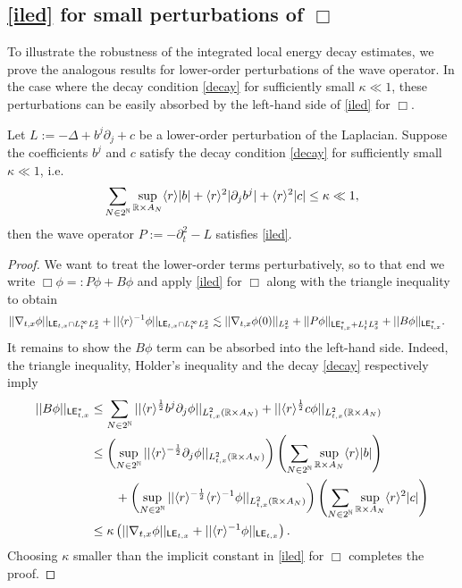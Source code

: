 \subsection{\eqref{iled} for small perturbations of $\Box$}\label{subsec:small}

To illustrate the robustness of the integrated local energy decay estimates, we prove the analogous results for lower-order perturbations of the wave operator. In the case where the decay condition \eqref{decay} for sufficiently small $\kappa \ll 1$, these perturbations can be easily absorbed by the left-hand side of \eqref{iled} for $\Box$. 

	
\begin{theorem}
	Let $L := - \Delta + b^j \partial_j + c$ be a lower-order perturbation of the Laplacian. Suppose the coefficients $b^j$ and $c$ satisfy the decay condition \eqref{decay} for sufficiently small $\kappa \ll 1$, i.e.
	\[
		\sum_{N \in 2^\mathbb N} \sup_{\mathbb R \times A_N} \langle r \rangle |b| + \langle r \rangle^2 |\partial_j b^j| + \langle r \rangle^2 |c| \leq \kappa \ll 1,
	\]
	then the wave operator $P := - \partial_t^2 - L$ satisfies \eqref{iled}.
\end{theorem}

\begin{proof}
	We want to treat the lower-order terms perturbatively, so to that end we write $\Box \phi =: P\phi + B\phi$ and apply \eqref{iled} for $\Box$ along with the triangle inequality to obtain 
		\begin{align*}
			||\nabla_{t, x} \phi||_{\mathsf{LE}_{t, x} \cap L^\infty_t L^2_x} + ||\langle r \rangle^{-1} \phi||_{\mathsf{LE}_{t, x} \cap L^\infty_t L^2_x} 
				&\lesssim ||\nabla_{t, x} \phi(0)||_{L^2_x} + ||P\phi||_{\mathsf{LE}^*_{t, x} + L^1_t L^2_x} + ||B \phi||_{\mathsf{LE}^*_{t, x}}.
		\end{align*}	
	It remains to show the $B\phi$ term can be absorbed into the left-hand side. Indeed, the triangle inequality, Holder's inequality and the decay \eqref{decay} respectively imply 
		\begin{align*}
			||B\phi||_{\mathsf{LE}^*_{t, x}} 
				&\leq \sum_{N \in 2^\mathbb N} || \langle r \rangle^{\frac12} b^j \partial_j \phi||_{L^2_{t, x} (\mathbb R \times A_N)} + || \langle r \rangle^{\frac12} c \phi||_{L^2_{t, x} (\mathbb R \times A_N)} \\
				&\leq \left( \sup_{N \in 2^\mathbb N} || \langle r \rangle^{-\frac12} \partial_j \phi ||_{L^2_{t, x} (\mathbb R \times A_N)} \right) \left( \sum_{N \in 2^\mathbb N} \sup_{\mathbb R \times A_N} \langle r \rangle |b| \right) \\
				& \qquad + \left( \sup_{N \in 2^\mathbb N} || \langle r \rangle^{-\frac12} \langle r \rangle^{-1} \phi ||_{L^2_{t, x} (\mathbb R \times A_N)} \right) \left( \sum_{N \in 2^\mathbb N} \sup_{\mathbb R \times A_N} \langle r \rangle^2 |c| \right) \\
				&\leq \kappa \left( ||\nabla_{t, x} \phi||_{\mathsf{LE}_{t, x}} + ||\langle r \rangle^{-1} \phi||_{\mathsf{LE}_{t, x}} \right).
		\end{align*}
	Choosing $\kappa$ smaller than the implicit constant in \eqref{iled} for $\Box$ completes the proof. 	
\end{proof}	